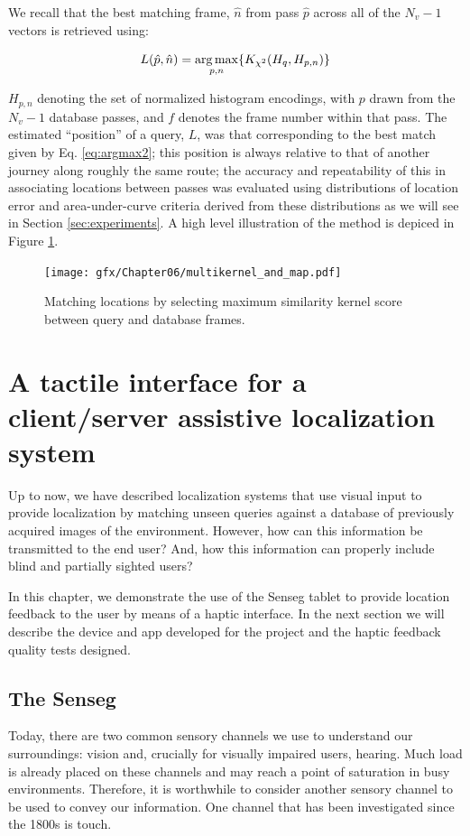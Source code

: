 We recall that the best matching frame, $\hat{n}$ from pass $\hat{p}$ across all of the $N_v-1$ vectors is retrieved using: 

\begin{equation}
\centering
L(\hat{p},\hat{n}) = \underset{p,n}{\arg \max} \lbrace K_{\chi^2}(H_q,H_{p,n})\rbrace
\label{eq:argmax2}
\end{equation}


$H_{p,n}$ denoting the set of normalized histogram encodings, with $p$ drawn from the $N_v-1$ database passes, and $f$ denotes the frame number within that pass.  The estimated ``position'' of a query, $L$, was that corresponding to the best match given by Eq. \ref{eq:argmax2}; this position is always relative to that of another journey along roughly the same route; the accuracy and repeatability of this in associating locations between passes was evaluated using distributions of location error and area-under-curve criteria derived from these distributions as we will see in Section \ref{sec:experiments}. A high level illustration of the method is depiced in Figure  \ref{fig:matching_from_kernels}.

\begin{figure}
\centering
\texttt{[image: gfx/Chapter06/multikernel\_and\_map.pdf]}
\caption{Matching locations by selecting maximum similarity kernel score between query and database frames.}
\label{fig:matching_from_kernels}
\end{figure}



\section{A tactile interface for a client/server assistive localization system}
\label{sec:tactile}
Up to now, we have described localization systems that use visual input to provide localization by matching unseen queries against a database of previously acquired images of the environment. However, how can this information be transmitted to the end user? And, how this information can properly include blind and partially sighted users?

In this chapter, we demonstrate the use of the Senseg tablet to provide location feedback to the user by means of a haptic interface. In the next section we will describe the device and app developed for the project and the haptic feedback quality tests designed.

\subsection{The Senseg}
Today, there are two common sensory channels we use to understand our surroundings: vision and, crucially for visually impaired users, hearing. Much load is already placed on these channels  and may reach a point of saturation in busy environments. Therefore, it is worthwhile to consider another sensory channel to be used to convey our information. One channel that has been investigated since the 1800s is touch. 

